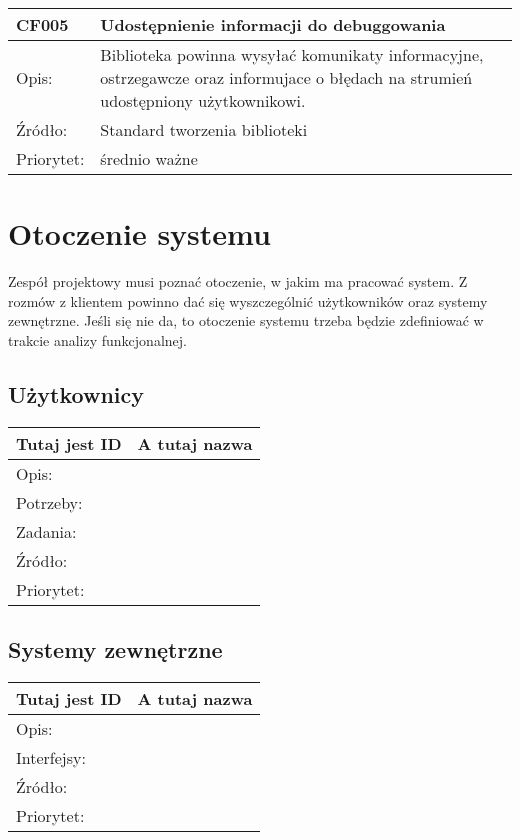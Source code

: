 \documentclass[a4paper,10pt]{article}
\begin{document}
\begin{tabular}{|p{3cm}|p{9cm}|} \hline

CF005 & Udostępnienie informacji do debuggowania  \\ \hline
Opis: &  Biblioteka powinna wysyłać komunikaty informacyjne, ostrzegawcze oraz informujace o błędach na strumień udostępniony użytkownikowi.  \\ \hline
Źródło: & Standard tworzenia biblioteki \cite{artOstandardach} \\ \hline
Priorytet: & średnio ważne \\ \hline

\end{tabular}



\section{Otoczenie systemu}

Zespół projektowy musi poznać otoczenie, w jakim ma pracować system. Z rozmów z klientem powinno dać się wyszczególnić użytkowników oraz systemy zewnętrzne. Jeśli się nie da, to otoczenie systemu trzeba będzie zdefiniować w trakcie analizy funkcjonalnej.

\subsection{Użytkownicy}


\begin{tabular}{|p{3cm}|p{9cm}|} \hline

Tutaj jest ID & A tutaj nazwa \\ \hline
Opis: &  \\ \hline
Potrzeby: &  \\ \hline
Zadania: &  \\ \hline
Źródło: &  \\ \hline
Priorytet: &  \\ \hline

\end{tabular}


\subsection{Systemy zewnętrzne}

\begin{center}
\begin{tabular}{|p{3cm}|p{9cm}|} \hline

Tutaj jest ID & A tutaj nazwa \\ \hline
Opis: &  \\ \hline
Interfejsy: &  \\ \hline
Źródło: &  \\ \hline
Priorytet: &  \\ \hline

\end{tabular}
\end{center}
\end{document}

